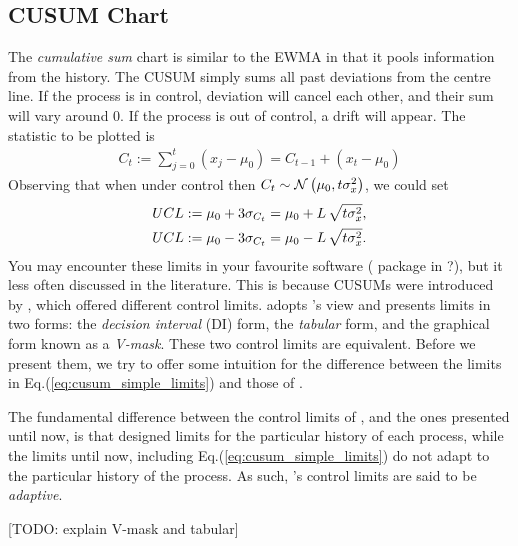 \subsection[CUSUM]{CUSUM Chart}
The \emph{cumulative sum} chart is similar to the EWMA in that it pools information from the history. 
The CUSUM simply sums all past deviations from the centre line.
If the process is in control, deviation will cancel each other, and their sum will vary around $0$. 
If the process is out of control, a drift will appear. 
The statistic to be plotted is 
\begin{align}
	C_t:= \sum_{j=0}^{t}(x_j-\mu_0)=C_{t-1}+ (x_t-\mu_0)
\end{align} 
Observing that when under control then $C_t \sim \mathcal{N}\left(\mu_0, t \sigma_x^2\right)$, we could set 
\begin{align}
\label{eq:cusum_simple_limits}
\begin{split}
	UCL &:= \mu_0 + 3 \sigma_{C_t}= \mu_0 + L \, \sqrt{t \sigma_x^2},  \\
	UCL &:= \mu_0 - 3 \sigma_{C_t}= \mu_0 - L \, \sqrt{t \sigma_x^2}.
\end{split}
\end{align}
You may encounter these limits in your favourite software ( package in \R?), but it less often discussed in the literature. 
This is because CUSUMs were introduced by \cite{page_continuous_1954}, which offered different control limits. 
\cite{montgomery_introduction_2007} adopts \citeauthor{page_continuous_1954}'s view and presents limits in two forms: the \emph{decision interval} (DI) form, \aka the \emph{tabular} form, and the graphical form known as a \emph{V-mask}.
These two control limits are equivalent. Before we present them, we try to offer some intuition for the difference between the limits in Eq.(\ref{eq:cusum_simple_limits}) and those of \cite{page_continuous_1954}.

The fundamental difference between the control limits of \cite{page_continuous_1954}, and the ones presented until now, is that \citeauthor{page_continuous_1954} designed limits for the particular history of each process, while the limits until now, including Eq.(\ref{eq:cusum_simple_limits}) do not adapt to the particular history of the process.
As such, \citeauthor{page_continuous_1954}'s control limits are said to be \emph{adaptive}.

[TODO: explain V-mask and tabular]





